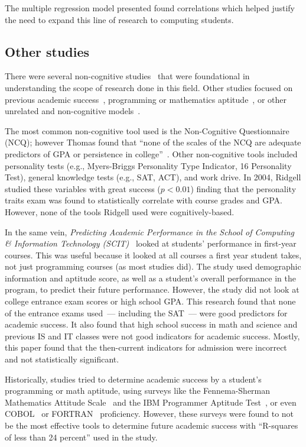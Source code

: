 The multiple regression model presented found correlations which helped justify the need to expand this line of research to computing students.

\subsection{Other studies}
There were several non-cognitive studies~\citep{thomas2007, elnagar2013, ridgell2004, ting2001} that were foundational in understanding the scope of research done in this field. Other studies focused on previous academic success~\citep{barlow2011, golding2005, ting2001, campbell1984}, programming or mathematics aptitude~\citep{nowaczyk1984, evans1989}, or other unrelated and non-cognitive models~\citep{barlow2011, elnagar2013}.

The most common non-cognitive tool used is the Non-Cognitive Questionnaire (NCQ); however Thomas found that ``none of the scales of the NCQ are adequate predictors of GPA or persistence in college''~\citep{thomas2007}. Other non-cognitive tools included personality tests (e.g., Myers-Briggs Personality Type Indicator, 16 Personality Test), general knowledge tests (e.g., SAT, ACT), and work drive. In 2004, Ridgell studied these variables with great success ($p<0.01$) finding that the personality traits exam was found to statistically correlate with course grades and GPA. However, none of the tools Ridgell used were cognitively-based.

In the same vein, \textit{Predicting Academic Performance in the School of Computing \& Information Technology (SCIT)}~\citep{golding2005} looked at students' performance in first-year courses. This was useful because it looked at all courses a first year student takes, not just programming courses (as most studies did). The study used demographic information and aptitude score, as well as a student's overall performance in the program, to predict their future performance. However, the study did not look at college entrance exam scores or high school GPA. This research found that none of the entrance exams used~--- including the SAT~--- were good predictors for academic success. It also found that high school success in math and science and previous IS and IT classes were not good indicators for academic success. Mostly, this paper found that the then-current indicators for admission were incorrect and not statistically significant.

Historically, studies tried to determine academic success by a student's programming or math aptitude, using surveys like the Fennema-Sherman Mathematics Attitude Scale~\citep{nowaczyk1984} and the IBM Programmer Aptitude Test~\citep{hostetler1983}, or even COBOL~\citep{nowaczyk1984} or FORTRAN~\citep{campbell1984} proficiency. However, these surveys were found to not be the most effective tools to determine future academic success with ``R-squares of less than 24 percent''\citep{evans1989} used in the study.

